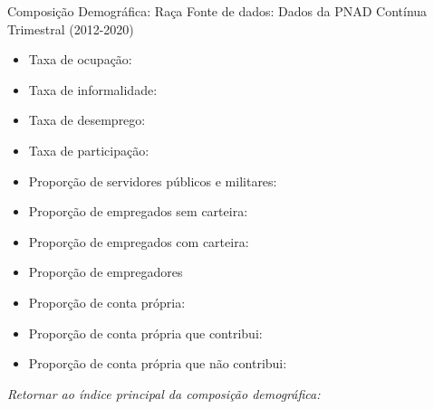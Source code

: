 \begin{frame}[label=_composicao_demografica_raca]{Composição Demográfica: Raça}
{\footnotesize Fonte de dados: Dados da PNAD Contínua Trimestral (2012-2020)}
\begin{itemize}
\item{Taxa de ocupação: \hyperlink{_composicao_demografica_raca_taxa_de_ocupacao}{}}
\item{Taxa de informalidade: \hyperlink{_composicao_demografica_raca_taxa_de_informalidade}{}}
\item{Taxa de desemprego: \hyperlink{_composicao_demografica_raca_taxa_de_desemprego}{}}
\item{Taxa de participação: \hyperlink{_composicao_demografica_raca_taxa_de_participacao}{}}
\item{Proporção de servidores públicos e militares: \hyperlink{_composicao_demografica_raca_prop_militar}{}}
\item{Proporção de empregados sem carteira: \hyperlink{_composicao_demografica_raca_prop_empregadoSC}{}}
\item{Proporção de empregados com carteira: \hyperlink{_composicao_demografica_raca_prop_empregadoCC}{}}
\item{Proporção de empregadores \hyperlink{_composicao_demografica_raca_prop_empregador}{}}
\item{Proporção de conta própria: \hyperlink{_composicao_demografica_raca_prop_cpropria}{}}
\item{Proporção de conta própria que contribui: \hyperlink{_composicao_demografica_raca_prop_cpropriaC}{}}
\item{Proporção de conta própria que não contribui: \hyperlink{_composicao_demografica_raca_prop_cpropriaNc}{}}
\end{itemize}

\begin{small}
\textit{Retornar ao índice principal da composição demográfica: \hyperlink{_composicao_demografica}{} }
\end{small}

\end{frame}

